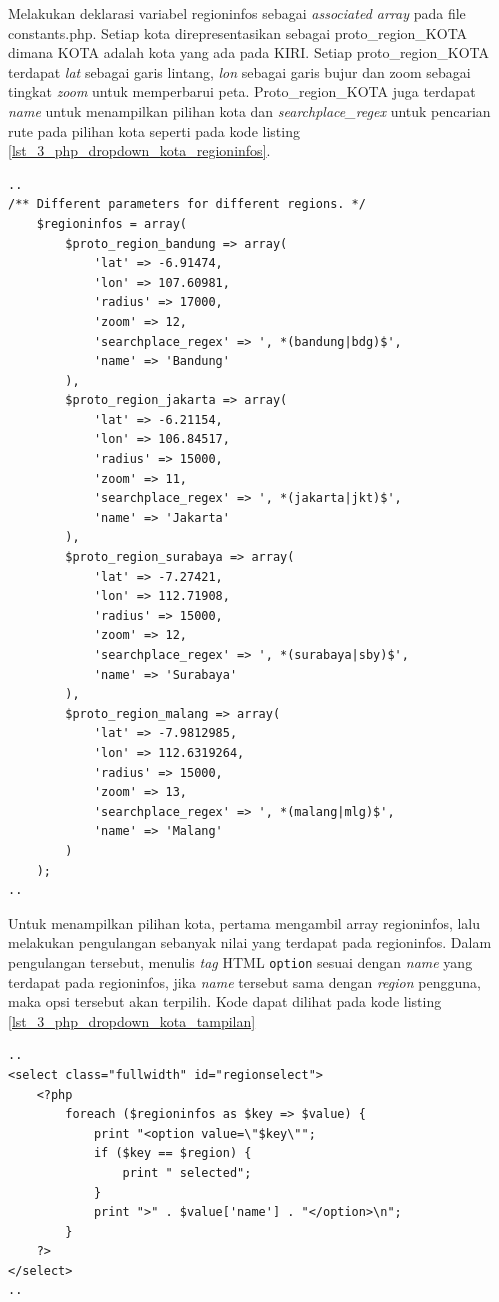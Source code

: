 Melakukan deklarasi variabel regioninfos sebagai \textit{associated array} pada file constants.php. Setiap kota direpresentasikan sebagai proto\_region\_KOTA dimana KOTA adalah kota yang ada pada KIRI. Setiap proto\_region\_KOTA terdapat \textit{lat} sebagai garis lintang, \textit{lon} sebagai garis bujur dan zoom sebagai tingkat \textit{zoom} untuk memperbarui peta. Proto\_region\_KOTA juga terdapat \textit{name} untuk menampilkan pilihan kota dan \textit{searchplace\_regex} untuk pencarian rute pada pilihan kota seperti pada kode listing \ref{lst_3_php_dropdown_kota_regioninfos}.

\begin{lstlisting}[caption=Deklarasi variabel regioninfos,label = {lst_3_php_dropdown_kota_regioninfos}]
..
/** Different parameters for different regions. */
	$regioninfos = array(
		$proto_region_bandung => array(
			'lat' => -6.91474,
			'lon' => 107.60981,
			'radius' => 17000,
			'zoom' => 12,
			'searchplace_regex' => ', *(bandung|bdg)$',
			'name' => 'Bandung'
		),
		$proto_region_jakarta => array(
			'lat' => -6.21154,
			'lon' => 106.84517,
			'radius' => 15000,
			'zoom' => 11,
			'searchplace_regex' => ', *(jakarta|jkt)$',
			'name' => 'Jakarta'
		),
		$proto_region_surabaya => array(
			'lat' => -7.27421,
			'lon' => 112.71908,
			'radius' => 15000,
			'zoom' => 12,
			'searchplace_regex' => ', *(surabaya|sby)$',
			'name' => 'Surabaya'
		),
		$proto_region_malang => array(
			'lat' => -7.9812985,
			'lon' => 112.6319264,
			'radius' => 15000,
			'zoom' => 13,
			'searchplace_regex' => ', *(malang|mlg)$',
			'name' => 'Malang'				
		)
	);
..
\end{lstlisting}

Untuk menampilkan pilihan kota, pertama mengambil array regioninfos, lalu melakukan pengulangan sebanyak nilai yang terdapat pada regioninfos. Dalam pengulangan tersebut, menulis \textit{tag} HTML \verb!option! sesuai dengan \textit{name} yang terdapat pada regioninfos, jika \textit{name} tersebut sama dengan \textit{region} pengguna, maka opsi tersebut akan terpilih. Kode dapat dilihat pada kode listing \ref{lst_3_php_dropdown_kota_tampilan}

\begin{lstlisting}[caption=Menampilkan pilihan kota kepada pengguna ,label = {lst_3_php_dropdown_kota_tampilan}]
..
<select class="fullwidth" id="regionselect">
	<?php
		foreach ($regioninfos as $key => $value) {
			print "<option value=\"$key\"";
			if ($key == $region) {
				print " selected";
			}
			print ">" . $value['name'] . "</option>\n";
		}
	?>
</select>
..
\end{lstlisting}

